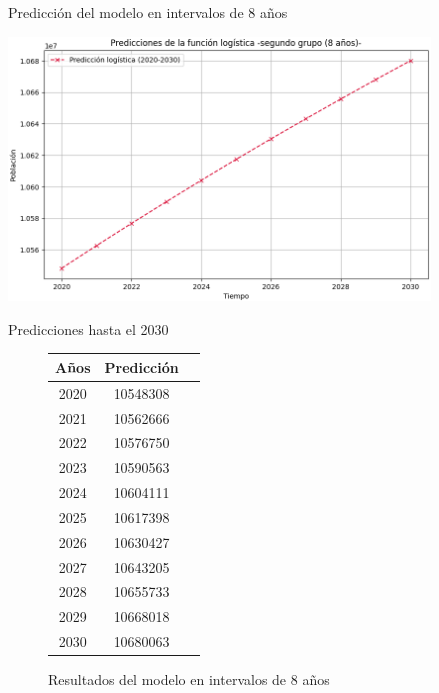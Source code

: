\documentclass{beamer}
\begin{document}
\begin{frame}{Predicción del modelo en intervalos de 8 años}
    \begin{center}
        \includegraphics[height = 7cm]{img/df8_graph.png}
    \end{center}
\end{frame}

\begin{frame}{Predicciones hasta el 2030}
    \begin{figure}[h!]%
		\begin{center}
			\begin{tabular}{|c|c|c|} \hline
            Años	& Predicción		\\ \hline
            2020 	& 10548308		    \\ \hline
            2021 	& 10562666		    \\ \hline
            2022 	& 10576750		    \\ \hline
            2023 	& 10590563		    \\ \hline
            2024 	& 10604111		    \\ \hline
            2025 	& 10617398		    \\ \hline
            2026 	& 10630427		    \\ \hline
            2027 	& 10643205		    \\ \hline
            2028 	& 10655733		    \\ \hline
            2029 	& 10668018		    \\ \hline
            2030 	& 10680063		    \\ \hline
            \end{tabular}
        \caption{Resultados del modelo en intervalos de 8 años\label{fig:ex}}
    \end{center}
\end{figure}
\end{frame}
\end{document}

